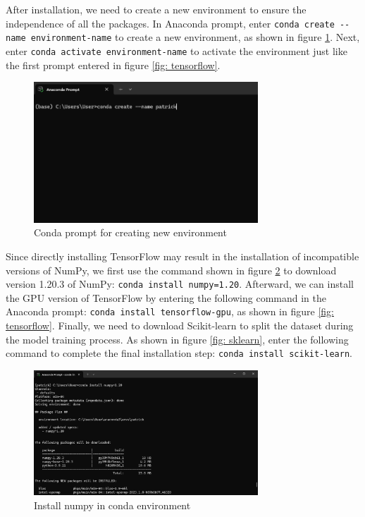 \begin{ZhChapter}
After installation, we need to create a new environment to ensure the independence of all the packages. In Anaconda prompt, enter \verb|conda create --name environment-name| to create a new environment, as shown in figure \ref{fig: createEnv}. Next, enter \verb|conda activate environment-name| to activate the environment just like the first prompt entered in figure \ref{fig: tensorflow}.

\begin{figure}[htbp]
    \centering
    \includegraphics[width = 0.75\textwidth]{image/createEnv.png}
    \caption{Conda prompt for creating new environment}
    \label{fig: createEnv}
\end{figure}

Since directly installing TensorFlow may result in the installation of incompatible versions of NumPy, we first use the command shown in figure \ref{fig: numpy} to download version 1.20.3 of  NumPy: \verb|conda install numpy=1.20|. Afterward, we can install the GPU version of TensorFlow by entering the following command in the Anaconda prompt: \verb|conda install tensorflow-gpu|, as shown in figure \ref{fig: tensorflow}. Finally, we need to download Scikit-learn to split the dataset during the model training process. As shown in figure \ref{fig: sklearn}, enter the following command to complete the final installation step: \verb|conda install scikit-learn|.

\begin{figure}[htbp]
    \centering
    \includegraphics[width = 0.75\textwidth]{image/numpy.png}
    \caption{Install numpy in conda environment}
    \label{fig: numpy}
\end{figure}


\end{ZhChapter}
